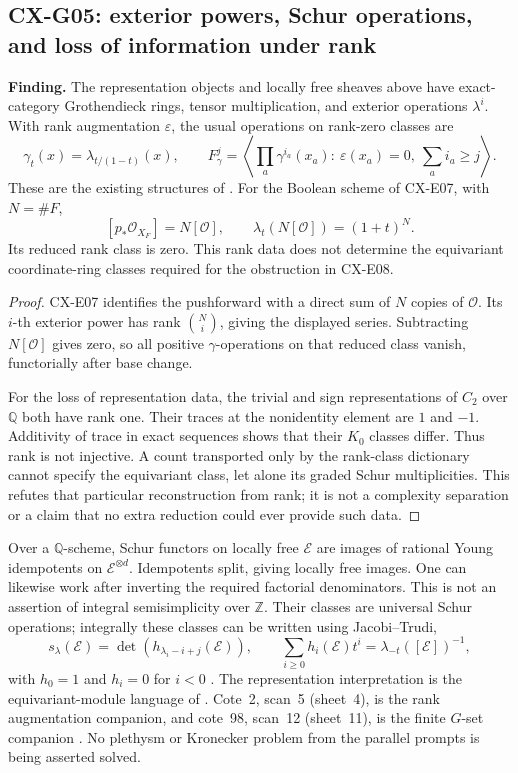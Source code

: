 \documentclass[11pt,a4paper]{article}
\begin{document}
\subsection{CX-G05: exterior powers, Schur operations, and loss of information under rank}
\label{finding:CX-G05}

\textbf{Finding.} The representation objects and locally free sheaves above
have exact-category Grothendieck rings, tensor multiplication, and exterior
operations $\lambda^i$.  With rank augmentation $\varepsilon$, the usual
operations on rank-zero classes are
\[
 \gamma_t(x)=\lambda_{t/(1-t)}(x),\qquad
 F^j_\gamma=\left\langle
  \prod_a\gamma^{i_a}(x_a):\ \varepsilon(x_a)=0,\ \sum_a i_a\geq j
 \right\rangle .
\]
These are the existing structures of
\cite[Exp.~V 2.4, 3.10(3.10.1); Exp.~VI 3.2--3.3]{SGA6}.
For the Boolean scheme of CX-E07, with $N=\#F$,
\[
 [p_*\mathcal O_{X_F}]=N[\mathcal O],\qquad
 \lambda_t(N[\mathcal O])=(1+t)^N.
\]
Its reduced rank class is zero.  This rank data does not determine the
equivariant coordinate-ring classes required for the obstruction in CX-E08.

\begin{proof}
CX-E07 identifies the pushforward with a direct sum of $N$ copies of
$\mathcal O$.  Its $i$-th exterior power has rank $\binom Ni$, giving the
displayed series.  Subtracting $N[\mathcal O]$ gives zero, so all positive
$\gamma$-operations on that reduced class vanish, functorially after base
change.

For the loss of representation data, the trivial and sign representations
of $C_2$ over $\mathbb Q$ both have rank one.  Their traces at the nonidentity
element are $1$ and $-1$.  Additivity of trace in exact sequences shows that
their $K_0$ classes differ.  Thus rank is not injective.  A count transported
only by the rank-class dictionary cannot specify the equivariant class,
let alone its graded Schur multiplicities.  This refutes that particular
reconstruction from rank; it is not a complexity separation or a claim
that no extra reduction could ever provide such data.
\end{proof}

Over a $\mathbb Q$-scheme, Schur functors on locally free $\mathcal E$ are
images of rational Young idempotents on $\mathcal E^{\otimes d}$.
Idempotents split, giving locally free images.  One can likewise work after
inverting the required factorial denominators.  This is not an assertion
of integral semisimplicity over $\mathbb Z$.
Their classes are universal Schur operations; integrally these classes can
be written using Jacobi--Trudi,
\[
 s_\lambda(\mathcal E)
 =\det(h_{\lambda_i-i+j}(\mathcal E)),\qquad
 \sum_{i\geq0}h_i(\mathcal E)t^i=\lambda_{-t}([\mathcal E])^{-1},
\]
with $h_0=1$ and $h_i=0$ for $i<0$
\cite[Chapter~I \S3, (3.4), p.~41]{Macdonald1995}.
The representation interpretation is the equivariant-module language of
\cite[Exp.~I 4.7.1--4.7.2]{SGA3}.  Cote~2, scan~5 (sheet~4), is the rank
augmentation companion, and cote~98, scan~12 (sheet~11), is the finite
$G$-set companion \cite{Archive2,Archive98}.  No plethysm or Kronecker
problem from the parallel prompts is being asserted solved.
\end{document}

